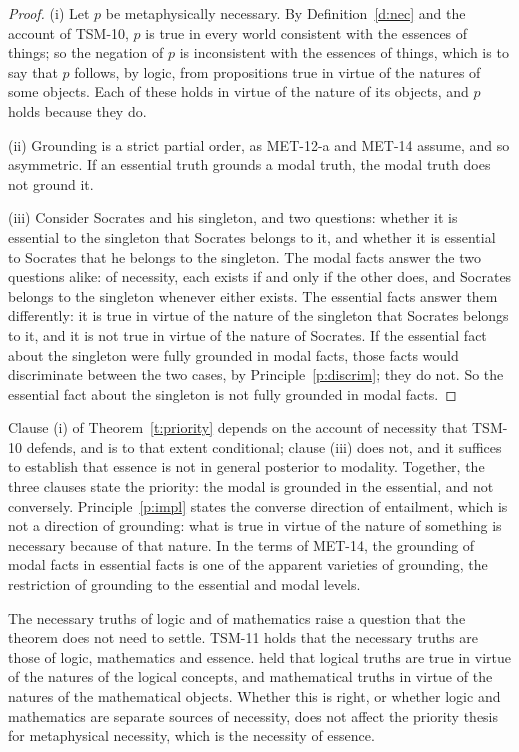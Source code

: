 \documentclass{situationist-preprint}
\begin{document}
\begin{proof}
(i) Let $p$ be metaphysically necessary. By Definition~\ref{d:nec} and the account of TSM-10, $p$ is true in every world consistent with the essences of things; so the negation of $p$ is inconsistent with the essences of things, which is to say that $p$ follows, by logic, from propositions true in virtue of the natures of some objects. Each of these holds in virtue of the nature of its objects, and $p$ holds because they do.

(ii) Grounding is a strict partial order, as MET-12-a and MET-14 assume, and so asymmetric. If an essential truth grounds a modal truth, the modal truth does not ground it.

(iii) Consider Socrates and his singleton, and two questions: whether it is essential to the singleton that Socrates belongs to it, and whether it is essential to Socrates that he belongs to the singleton. The modal facts answer the two questions alike: of necessity, each exists if and only if the other does, and Socrates belongs to the singleton whenever either exists. The essential facts answer them differently: it is true in virtue of the nature of the singleton that Socrates belongs to it, and it is not true in virtue of the nature of Socrates. If the essential fact about the singleton were fully grounded in modal facts, those facts would discriminate between the two cases, by Principle~\ref{p:discrim}; they do not. So the essential fact about the singleton is not fully grounded in modal facts.
\end{proof}

Clause (i) of Theorem~\ref{t:priority} depends on the account of necessity that TSM-10 defends, and is to that extent conditional; clause (iii) does not, and it suffices to establish that essence is not in general posterior to modality. Together, the three clauses state the priority: the modal is grounded in the essential, and not conversely. Principle~\ref{p:impl} states the converse direction of entailment, which is not a direction of grounding: what is true in virtue of the nature of something is necessary because of that nature. In the terms of MET-14, the grounding of modal facts in essential facts is one of the apparent varieties of grounding, the restriction of grounding to the essential and modal levels.

The necessary truths of logic and of mathematics raise a question that the theorem does not need to settle. TSM-11 holds that the necessary truths are those of logic, mathematics and essence. \citet{Fine1994} held that logical truths are true in virtue of the natures of the logical concepts, and mathematical truths in virtue of the natures of the mathematical objects. Whether this is right, or whether logic and mathematics are separate sources of necessity, does not affect the priority thesis for metaphysical necessity, which is the necessity of essence.
\end{document}
